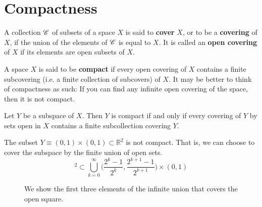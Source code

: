 \section{Compactness}

  \begin{definition}[Covers]
    A collection $\operatorname{\mathscr{C}}$ of subsets of a space $X$ is said to \textbf{cover} $X$, or to be a \textbf{covering} of $X$, if the union of the elements of $\operatorname{\mathscr{C}}$ is equal to $X$. It is called an \textbf{open covering} of $X$ if its elements are open subsets of $X$. 
  \end{definition}

  \begin{definition}[Compactness]
    A space $X$ is said to be \textbf{compact} if every open covering of $X$ contains a finite subcovering (i.e. a finite collection of subcovers) of $X$. It may be better to think of compactness as such: If you can find any infinite open covering of the space, then it is not compact. 
  \end{definition}

  \begin{lemma}
    Let $Y$ be a subspace of $X$. Then $Y$ is compact if and only if every covering of $Y$ by sets open in $X$ contains a finite subcollection covering $Y$. 
  \end{lemma}


  \begin{example}
    The subset $Y \equiv (0,1) \times (0,1) \subset \mathbb{R}^2$ is not compact. That is, we can choose to cover the subspace by the finite union of open sets. 
    \begin{equation}
      [0,1]^2 \subset \bigcup_{k=0}^\infty \Big( \frac{2^k - 1}{2^k}, \frac{2^{k+1} - 1}{2^{k+1}} \Big) \times (0,1)
    \end{equation}

    \begin{figure}[H]
      \centering 
      \caption{We show the first three elements of the infinite union that covers the open square. }
      \label{fig:closed_square_compact}
    \end{figure}
    \begin{center}
    \end{center}
  \end{example}

